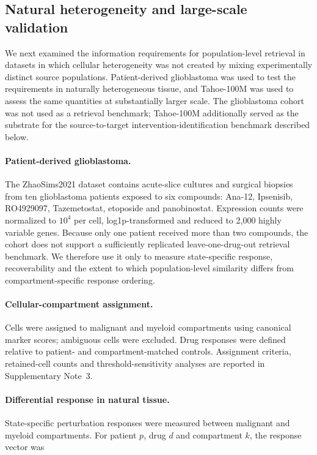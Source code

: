 \documentclass[11pt,letterpaper]{article}
\begin{document}
\fi
\subsection*{Natural heterogeneity and large-scale validation}

We next examined the information requirements for population-level retrieval in datasets in which
cellular heterogeneity was not created by mixing experimentally distinct source populations.
Patient-derived glioblastoma was used to test the requirements in naturally heterogeneous tissue,
and Tahoe-100M was used to assess the same quantities at substantially larger scale. The
glioblastoma cohort was not used as a retrieval benchmark; Tahoe-100M additionally served as the
substrate for the source-to-target intervention-identification benchmark described below.

\paragraph{Patient-derived glioblastoma.}
The ZhaoSims2021 dataset\cite{dataZhao} contains acute-slice cultures and surgical biopsies from ten glioblastoma
patients exposed to six compounds: Ana-12, Ipsenisib, RO4929097, Tazemetostat, etoposide and
panobinostat. Expression counts were normalized to $10^4$ per cell, log1p-transformed and reduced
to 2,000 highly variable genes. Because only one patient received more than two compounds, the
cohort does not support a sufficiently replicated leave-one-drug-out retrieval benchmark. We
therefore use it only to measure state-specific response, recoverability and the extent to which
population-level similarity differs from compartment-specific response ordering.

\paragraph{Cellular-compartment assignment.}
Cells were assigned to malignant and myeloid compartments using canonical marker scores; ambiguous
cells were excluded. Drug responses were defined relative to patient- and compartment-matched
controls. Assignment criteria, retained-cell counts and threshold-sensitivity analyses are reported
in Supplementary Note~3.

\paragraph{Differential response in natural tissue.}
State-specific perturbation responses were measured between malignant and myeloid compartments.
For patient $p$, drug $d$ and compartment $k$, the response vector was
\end{document}
